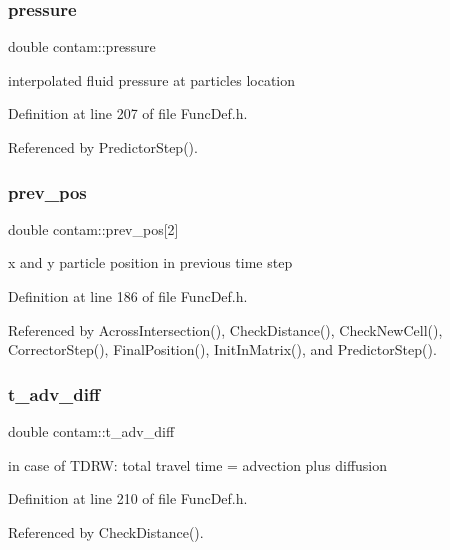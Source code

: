 \mbox{\label{structcontam_a185c332f0d90695ee85c1e243085e2ba}} 
\subsubsection{\texorpdfstring{pressure}{pressure}}
{\footnotesize\ttfamily double contam\+::pressure}

interpolated fluid pressure at particles location 

Definition at line 207 of file Func\+Def.\+h.



Referenced by Predictor\+Step().

\mbox{\label{structcontam_aacd8d2e19b4a3c689e96cf9693218777}} 
\subsubsection{\texorpdfstring{prev\_pos}{prev\_pos}}
{\footnotesize\ttfamily double contam\+::prev\+\_\+pos\mbox{[}2\mbox{]}}

x and y particle position in previous time step 

Definition at line 186 of file Func\+Def.\+h.



Referenced by Across\+Intersection(), Check\+Distance(), Check\+New\+Cell(), Corrector\+Step(), Final\+Position(), Init\+In\+Matrix(), and Predictor\+Step().

\mbox{\label{structcontam_aaa72e564c7052e029003076e0d8768be}} 
\subsubsection{\texorpdfstring{t\_adv\_diff}{t\_adv\_diff}}
{\footnotesize\ttfamily double contam\+::t\+\_\+adv\+\_\+diff}

in case of T\+D\+RW\+: total travel time = advection plus diffusion 

Definition at line 210 of file Func\+Def.\+h.



Referenced by Check\+Distance().

